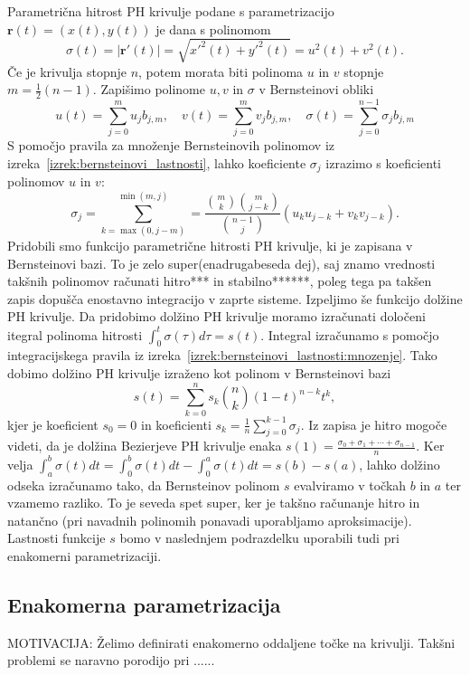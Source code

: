 \documentclass[isrm2, tisk]{fmfdelo}
\begin{document}
    Parametrična hitrost PH krivulje podane s parametrizacijo $\mathbf{r}(t)=(x(t),y(t))$ je dana s polinomom
    \[\sigma(t) = |\mathbf{r}'(t)| = \sqrt{x'^2(t)+y'^2(t)} = u^2(t)+v^2(t).\]
    Če je krivulja stopnje $n$, potem morata biti polinoma $u$ in $v$ stopnje $m=\frac{1}{2}(n-1)$.
    Zapišimo polinome $u,v$ in $\sigma$ v Bernsteinovi obliki \[u(t)=\sum_{j=0}^{m}u_j b_{j,m}, \quad v(t)=\sum_{j=0}^{m}v_j b_{j,m}, \quad \sigma(t)=\sum_{j=0}^{n-1}\sigma_j b_{j,m}\]
    S pomočjo pravila za množenje Bernsteinovih polinomov iz izreka~\ref{izrek:bernsteinovi_lastnosti}, lahko koeficiente $\sigma_j$ izrazimo s koeficienti polinomov $u$ in $v$:
    \[\sigma_j = \sum_{k=\max(0,j-m)}^{\min(m,j)} = \frac{\binom{m}{k}\binom{m}{j-k}}{\binom{n-1}{j}}(u_k u_{j-k}+v_k v_{j-k}).\]
    Pridobili smo funkcijo parametrične hitrosti PH krivulje, ki je zapisana v Bernsteinovi bazi.
    To je zelo super(enadrugabeseda dej), saj znamo vrednosti takšnih polinomov računati hitro*** in stabilno******, poleg tega pa takšen zapis dopušča enostavno integracijo v zaprte sisteme.
    Izpeljimo še funkcijo dolžine PH krivulje.
    Da pridobimo dolžino PH krivulje moramo izračunati določeni itegral polinoma hitrosti $\int_0^t\sigma(\tau)d\tau=s(t)$.
    Integral izračunamo s pomočjo integracijskega pravila iz izreka~\ref{izrek:bernsteinovi_lastnosti:mnozenje}.
    Tako dobimo dolžino PH krivulje izraženo kot polinom v Bernsteinovi bazi
    \[s(t)=\sum_{k=0}^n s_k \binom{n}{k}(1-t)^{n-k}t^k,\]
    kjer je koeficient $s_0=0$ in koeficienti $s_k = \frac{1}{n}\sum^{k-1}_{j=0}\sigma_j$.
    Iz zapisa je hitro mogoče videti, da je dolžina Bezierjeve PH krivulje enaka $s(1)=\frac{\sigma_0+\sigma_1+\cdots+\sigma_{n-1}}{n}$.
    Ker velja $\int_a^b \sigma(t)dt = \int_0^b\sigma(t)dt - \int_0^a\sigma(t)dt = s(b)-s(a)$, lahko dolžino odseka izračunamo tako, da Bernsteinov polinom $s$ evalviramo v točkah $b$ in $a$ ter vzamemo razliko.
    To je seveda spet super, ker je takšno računanje hitro in natančno (pri navadnih polinomih ponavadi uporabljamo aproksimacije).
    Lastnosti funkcije $s$ bomo v naslednjem podrazdelku uporabili tudi pri enakomerni parametrizaciji.

    \subsection{Enakomerna parametrizacija}
    MOTIVACIJA: Želimo definirati enakomerno oddaljene točke na krivulji. Takšni problemi se naravno porodijo pri ...... \newline
\end{document}
